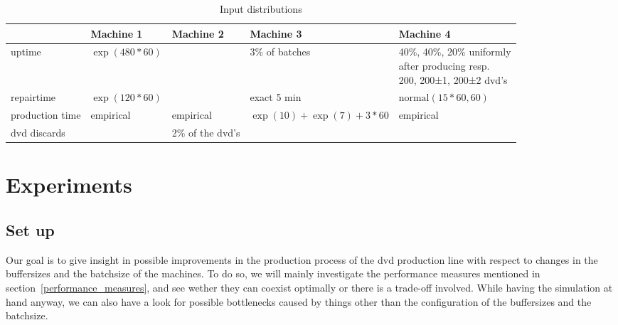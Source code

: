 \documentclass{article}
\begin{document}
\begin{table}[h]
    \begin{tabular}{|l|l|l|l|p{4cm}|}
    \hline
                    & Machine 1         & Machine 2         & Machine 3                     & Machine 4 \\ \hline
    uptime          & $\exp(480*60)$    &                   & 3\% of batches                & \parbox{5cm}{40\%, 40\%, 20\% uniformly\\ after producing resp.\\ 200, 200±1, 200±2 dvd's} \\ \hline
    repairtime      & $\exp(120*60)$    &                   & exact 5 min                   & $\mathrm{normal}(15*60, 60)$ \\ \hline
    production time & empirical         & empirical         & $\exp(10) + \exp(7) + 3*60$   & empirical \\ \hline
    dvd discards    &                   & 2\% of the dvd's  &                               & \\ \hline
    \end{tabular}
    \caption {Input distributions}
    \label{table:input_table}
\end{table}









\section{Experiments}
%
\subsection{Set up}
Our goal is to give insight in possible improvements in the production process of the dvd production line with respect to changes in the buffersizes and the batchsize of the machines.
To do so, we will mainly investigate the performance measures mentioned in section~\ref{performance_measures}, and see wether they can coexist optimally or there is a trade-off involved.
While having the simulation at hand anyway, we can also have a look for possible bottlenecks caused by things other than the configuration of the buffersizes and the batchsize.
\end{document}
